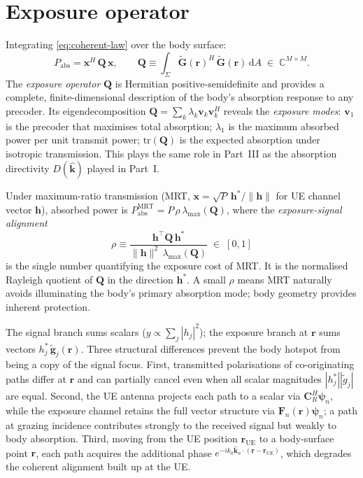 \documentclass[11pt,a4paper]{article}
\theoremstyle{definition}
\newcommand{\khat}{\hat{\bm{k}}}
\newcommand{\diff}{\mathrm{d}}
\begin{document}
\section{Exposure operator}\label{sec:Q}

Integrating \cref{eq:coherent-law} over the body surface:
\begin{equation}\label{eq:Q-def}
  P_{\mathrm{abs}} = \mathbf{x}^H\,\mathbf{Q}\,\mathbf{x},
  \qquad
  \boxed{\mathbf{Q} \equiv \int_\Sigma
    \tilde{\mathbf{G}}(\mathbf{r})^H\,\tilde{\mathbf{G}}(\mathbf{r})\,\diff A
    \;\in\;\mathbb{C}^{M\times M}.}
\end{equation}
The \emph{exposure operator} $\mathbf{Q}$ is Hermitian
positive-semidefinite and provides a complete, finite-dimensional
description of the body's absorption response to any precoder.  Its
eigendecomposition $\mathbf{Q}=\sum_k\lambda_k\mathbf{v}_k\mathbf{v}_k^H$ reveals
the \emph{exposure modes}: $\mathbf{v}_1$ is the precoder that maximises
total absorption; $\lambda_1$ is the maximum absorbed power per unit
transmit power; $\mathrm{tr}(\mathbf{Q})$ is the expected absorption
under isotropic transmission.  This plays the same role in Part~III as
the absorption directivity $D(\khat)$ played in Part~I.

Under maximum-ratio transmission (MRT, $\mathbf{x}=\sqrt{P}\,\mathbf{h}^*/\|\mathbf{h}\|$
for UE channel vector $\mathbf{h}$), absorbed power is
$P_{\mathrm{abs}}^{\mathrm{MRT}}=P\,\rho\,\lambda_{\max}(\mathbf{Q})$, where
the \emph{exposure-signal alignment}
\begin{equation}\label{eq:rho-def}
  \boxed{\rho \equiv \frac{\mathbf{h}^\top\mathbf{Q}\,\mathbf{h}^*}
    {\|\mathbf{h}\|^2\,\lambda_{\max}(\mathbf{Q})} \;\in\;[0,1]}
\end{equation}
is the single number quantifying the exposure cost of MRT.  It is the
normalised Rayleigh quotient of $\mathbf{Q}$ in the direction
$\mathbf{h}^*$.  A small $\rho$ means MRT naturally avoids illuminating
the body's primary absorption mode; body geometry provides inherent
protection.

The signal branch sums scalars ($y\propto\sum_j|h_j|^2$); the
exposure branch at $\mathbf{r}$ sums vectors
$h_j^*\,\tilde{\mathbf{g}}_j(\mathbf{r})$.  Three structural
differences prevent the body hotspot from being a copy of the signal
focus.  First, transmitted polarisations of co-originating paths
differ at $\mathbf{r}$ and can partially cancel even when all scalar
magnitudes $|h_j^*||\tilde{g}_j|$ are equal.  Second, the UE antenna
projects each path to a scalar via $\mathbf{C}_R^H\boldsymbol{\psi}_n$,
while the exposure channel retains the full vector structure via
$\mathbf{F}_n(\mathbf{r})\boldsymbol{\psi}_n$; a path at grazing
incidence contributes strongly to the received signal but weakly to
body absorption.  Third, moving from the UE position
$\mathbf{r}_\mathrm{UE}$ to a body-surface point $\mathbf{r}$,
each path acquires the additional phase
$e^{-ik_0\hat{\mathbf{k}}_n\cdot(\mathbf{r}-\mathbf{r}_\mathrm{UE})}$,
which degrades the coherent alignment built up at the UE.
\end{document}
